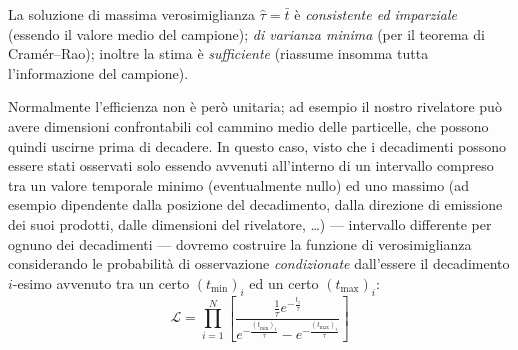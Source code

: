 La soluzione di massima verosimiglianza $\hat \tau = \bar t$
\`e \emph{consistente ed imparziale} (essendo il valore medio
del campione); \emph{di varianza minima} (per il teorema di
Cram\'er--Rao); inoltre la stima \`e \emph{sufficiente}
(riassume insomma tutta l'informazione del campione).

Normalmente l'efficienza non \`e per\`o unitaria; ad esempio
il nostro rivelatore pu\`o avere dimensioni confrontabili
col cammino medio delle particelle, che possono quindi
uscirne prima di decadere.  In questo caso, visto che i
decadimenti possono essere stati osservati solo essendo
avvenuti all'interno di un intervallo compreso tra un valore
temporale minimo (eventualmente nullo) ed uno massimo (ad
esempio dipendente dalla posizione del decadimento, dalla
direzione di emissione dei suoi prodotti, dalle dimensioni
del rivelatore, \ldots) --- intervallo differente per ognuno
dei decadimenti --- dovremo costruire la funzione di
verosimiglianza considerando le probabilit\`a di
osservazione \emph{condizionate} dall'essere il decadimento
$i$-esimo avvenuto tra un certo $(t_{\min})_i$ ed un certo
$(t_{\max})_i$:
\begin{equation} \label{eq:11.taulik}
  \mathcal{L} = \prod_{i=1}^N \left[ \frac{ \frac{1}{\tau}
      e^{- \frac{t_i}{\tau}} }{ e^{-
        \frac{(t_{\min})_i}{\tau}} - e^{-
        \frac{(t_{\max})_i}{\tau}} } \right]
\end{equation}

